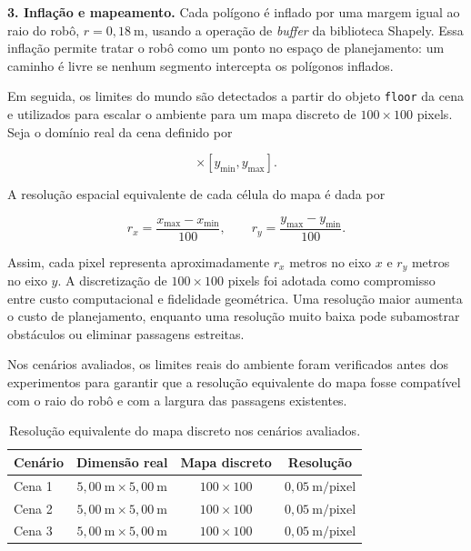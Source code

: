 \textbf{3. Inflação e mapeamento.} Cada polígono é inflado por uma margem igual ao raio do robô, $r = 0{,}18~\text{m}$, usando a operação de \emph{buffer} da biblioteca Shapely. Essa inflação permite tratar o robô como um ponto no espaço de planejamento: um caminho é livre se nenhum segmento intercepta os polígonos inflados.

Em seguida, os limites do mundo são detectados a partir do objeto \texttt{floor} da cena e utilizados para escalar o ambiente para um mapa discreto de $100 \times 100$ pixels. Seja o domínio real da cena definido por

\begin{equation}
    [x_{\min}, x_{\max}] \times [y_{\min}, y_{\max}].
    \label{eq:world_bounds}
\end{equation}

A resolução espacial equivalente de cada célula do mapa é dada por

\begin{equation}
    r_x = \frac{x_{\max} - x_{\min}}{100},
    \qquad
    r_y = \frac{y_{\max} - y_{\min}}{100}.
    \label{eq:map_resolution}
\end{equation}

Assim, cada pixel representa aproximadamente $r_x$ metros no eixo $x$ e $r_y$ metros no eixo $y$. A discretização de $100 \times 100$ pixels foi adotada como compromisso entre custo computacional e fidelidade geométrica. Uma resolução maior aumenta o custo de planejamento, enquanto uma resolução muito baixa pode subamostrar obstáculos ou eliminar passagens estreitas.

Nos cenários avaliados, os limites reais do ambiente foram verificados antes dos experimentos para garantir que a resolução equivalente do mapa fosse compatível com o raio do robô e com a largura das passagens existentes.

\begin{table}[H]
\centering
\caption{Resolução equivalente do mapa discreto nos cenários avaliados.}
\label{tab:resolucao_mapa}
\begin{tabular}{lccc}
\toprule
Cenário & Dimensão real & Mapa discreto & Resolução \\
\midrule
Cena 1 & $5{,}00~\text{m} \times 5{,}00~\text{m}$ & $100 \times 100$ & $0{,}05~\text{m/pixel}$ \\
Cena 2 & $5{,}00~\text{m} \times 5{,}00~\text{m}$ & $100 \times 100$ & $0{,}05~\text{m/pixel}$ \\
Cena 3 & $5{,}00~\text{m} \times 5{,}00~\text{m}$ & $100 \times 100$ & $0{,}05~\text{m/pixel}$ \\
\bottomrule
\end{tabular}
\end{table}

